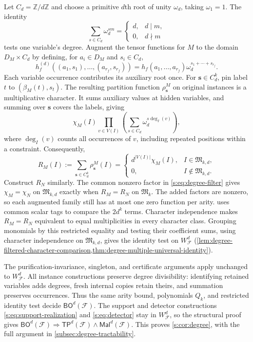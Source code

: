 \documentclass[11pt,letterpaper,onecolumn]{article}
\theoremstyle{plain}
\theoremstyle{definition}
\theoremstyle{remark}
\newcommand{\cF}{\mathcal F}
\newcommand{\BO}{\mathsf{BO}}
\newcommand{\TP}{\mathsf{TP}}
\newcommand{\Mal}{\mathsf{Mal}}
\newcommand{\WFdeg}[1]{W_{\cF}^{#1}}
\begin{document}
Let $C_d=\mathbb Z/d\mathbb Z$ and choose a primitive $d$th root
of unity $\omega_d$, taking $\omega_1=1$. The identity
\[
 \sum_{s\in C_d}\omega_d^{sm}
 =\begin{cases}d,&d\mid m,\\0,&d\nmid m\end{cases}
\]
tests one variable's degree. Augment the tensor functions for $M$ to
the domain $D_M\times C_d$ by defining, for $a_i\in D_M$ and $s_i\in C_d$,
\[
 h_f^{(d)}((a_1,s_1),\ldots,(a_{r_f},s_{r_f}))
 =h_f(a_1,\ldots,a_{r_f})\omega_d^{s_1+\cdots+s_{r_f}}.
\]
Each variable occurrence contributes its auxiliary root once.
For $\mathbf s\in C_d^k$, pin label $t$ to $(\beta_M(t),s_t)$.
The resulting partition function $\rho^M_{\mathbf s}$ on original
instances is a multiplicative character. It sums auxiliary values at
hidden variables, and summing over $\mathbf s$ covers the labels, giving
\[
 \chi_M(I)\prod_{v\in V(I)}
       \left(\sum_{s\in C_d}\omega_d^{s\deg_I(v)}\right),
\]
where $\deg_I(v)$ counts all occurrences of $v$, including repeated
positions within a constraint. Consequently,
\begin{equation}
 R_M(I):=\sum_{\mathbf s\in C_d^k}\rho^M_{\mathbf s}(I)
 =\begin{cases}
   d^{|V(I)|}\chi_M(I),&I\in\mathfrak M_{k,d},\\
   0,&I\notin\mathfrak M_{k,d}.
  \end{cases}
 \label{s:eq:degree-filter}
\end{equation}
Construct $R_N$ similarly. The common nonzero factor in
\eqref{s:eq:degree-filter} gives
$\chi_M=\chi_N$ on $\mathfrak M_{k,d}$ exactly when $R_M=R_N$
on $\mathfrak M_k$. The added factors are nonzero, so each
augmented family still has at most one zero function per arity.
 uses common scalar tags to compare the
$2d^k$ terms. Character independence makes $R_M=R_N$ equivalent to
equal multiplicities in every character class.
Grouping monomials by this restricted equality and testing their
coefficient sums, using character independence on $\mathfrak M_{k,d}$,
gives the identity test on
$\WFdeg{d}$ (\cref{lem:degree-filtered-character-comparison,thm:degree-multiple-universal-identity}).

The purification-invariance, singleton, and certificate arguments apply
unchanged to $\WFdeg{d}$. All instance constructions preserve degree
divisibility: identifying retained variables adds degrees, fresh internal
copies retain theirs, and summation preserves occurrences. Thus the same
arity bound, polynomials $Q_k$, and restricted identity test decide
$\BO^d(\cF)$. The support and detector constructions
\eqref{s:eq:support-realization} and \eqref{s:eq:detector} stay in
$\WFdeg{d}$, so the structural proof gives
$\BO^d(\cF)\Rightarrow\TP^d(\cF)\wedge\Mal^d(\cF)$.
This proves \cref{s:cor:degree}, with the full argument in
\cref{subsec:degree-tractability}.
\end{document}
